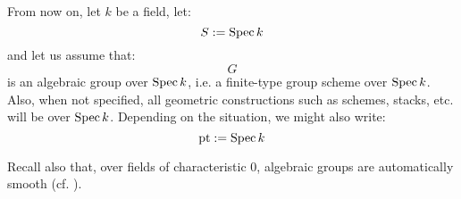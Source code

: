             \begin{convention}
                From now on, let $k$ be a field, let:
                    $$S := \operatorname{Spec} k$$
                and let us assume that:
                    $$G$$
                is an algebraic group over $\operatorname{Spec} k$, i.e. a finite-type group scheme over $\operatorname{Spec} k$. Also, when not specified, all geometric constructions such as schemes, stacks, etc. will be over $\operatorname{Spec} k$. Depending on the situation, we might also write:
                    $$\mathrm{pt} := \operatorname{Spec} k$$
                
                Recall also that, over fields of characteristic $0$, algebraic groups are automatically smooth (cf. \cite[\href{https://stacks.math.columbia.edu/tag/047N}{Tag 047N}]{stacks}).
            \end{convention}

